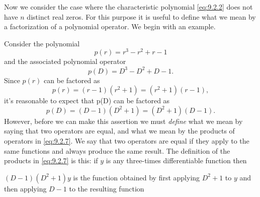 Now we consider the case where the characteristic polynomial \eqref{eq:9.2.2} does not have $n$
distinct real zeros. For this purpose it is useful to define what we mean by a factorization of a
polynomial operator. We begin with an example.

\begin{example}
  \label{example:9.2.2} \rm Consider the polynomial
  \[
    p(r)=r^{3}-r^{2}+r-1
  \]
  and the associated polynomial operator
  \[
    p(D)=D^{3}-D^{2}+D-1.
  \]
  Since $p(r)$ can be factored as
  \[
    p(r)=(r-1)(r^{2}+1)=(r^{2}+1)(r-1),
  \]
  it's reasonable to expect that p(D) can be factored as
  \begin{equation}
    \label{eq:9.2.7}p(D)=(D-1)(D^{2}+1)=(D^{2}+1)(D-1).
  \end{equation}
  However, before we can make this assertion we must {\color{blue}\it define\/} what we mean by
  saying that two operators are equal, and what we mean by the products of operators in
  \eqref{eq:9.2.7}. We say that two operators are equal if they apply to the same functions and
  always produce the same result. The definition of the products in \eqref{eq:9.2.7} is this: if
  $y$ is any three-times differentiable function then
  \begin{alist}
    \item %
    $(D-1)(D^{2}+1)y$ is the function obtained by first applying $D^{2}+1$ to $y$ and then applying
    $D-1$ to the resulting function


\end{alist}
\end{example}
